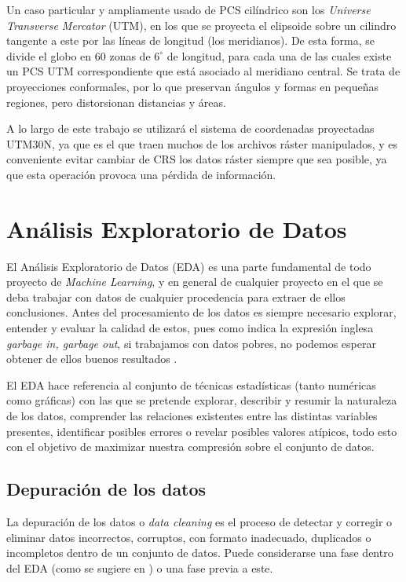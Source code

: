 \documentclass[12pt,a4paper,]{book}
\numberwithin{dummy}{section}
\theoremstyle{ocrenumbox}
\theoremstyle{blacknumex}
\theoremstyle{blacknumbox}
\theoremstyle{ocrenum}
\theoremstyle{ocrenum}
\begin{document}
Un caso particular y ampliamente usado de PCS cilíndrico son los
\emph{Universe Transverse Mercator} (UTM), en los que se proyecta el
elipsoide sobre un cilindro tangente a este por las líneas de longitud
(los meridianos). De esta forma, se divide el globo en 60 zonas de
\(6^\circ\) de longitud, para cada una de las cuales existe un PCS UTM
correspondiente que está asociado al meridiano central. Se trata de
proyecciones conformales, por lo que preservan ángulos y formas en
pequeñas regiones, pero distorsionan distancias y áreas.

A lo largo de este trabajo se utilizará el sistema de coordenadas
proyectadas UTM30N, ya que es el que traen muchos de los archivos ráster
manipulados, y es conveniente evitar cambiar de CRS los datos ráster
siempre que sea posible, ya que esta operación provoca una pérdida de
información.

\hypertarget{anuxe1lisis-exploratorio-de-datos}{%
\section{Análisis Exploratorio de
Datos}\label{anuxe1lisis-exploratorio-de-datos}}

El Análisis Exploratorio de Datos (EDA) es una parte fundamental de todo
proyecto de \emph{Machine Learning}, y en general de cualquier proyecto
en el que se deba trabajar con datos de cualquier procedencia para
extraer de ellos conclusiones. Antes del procesamiento de los datos es
siempre necesario explorar, entender y evaluar la calidad de estos, pues
como indica la expresión inglesa \emph{garbage in, garbage out}, si
trabajamos con datos pobres, no podemos esperar obtener de ellos buenos
resultados \citep{wickham2016r}.

El EDA hace referencia al conjunto de técnicas estadísticas (tanto
numéricas como gráficas) con las que se pretende explorar, describir y
resumir la naturaleza de los datos, comprender las relaciones existentes
entre las distintas variables presentes, identificar posibles errores o
revelar posibles valores atípicos, todo esto con el objetivo de
maximizar nuestra compresión sobre el conjunto de datos.

\hypertarget{depuraciuxf3n-de-los-datos}{%
\subsection{Depuración de los datos}\label{depuraciuxf3n-de-los-datos}}

La depuración de los datos o \emph{data cleaning} es el proceso de
detectar y corregir o eliminar datos incorrectos, corruptos, con formato
inadecuado, duplicados o incompletos dentro de un conjunto de datos.
Puede considerarse una fase dentro del EDA (como se sugiere en
\citep{wickham2016r}) o una fase previa a este.
\end{document}
